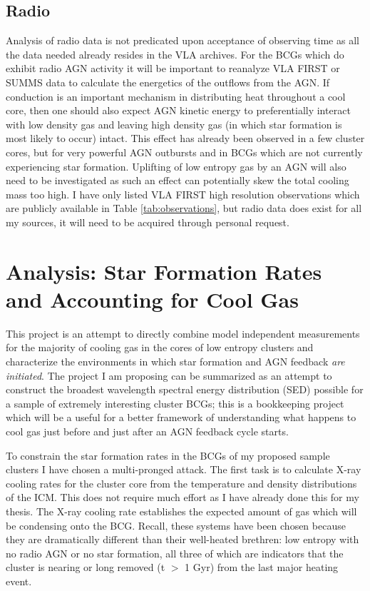 \documentclass[11pt]{article}
\begin{document}
\subsection{Radio}
Analysis of radio data is not predicated upon acceptance of observing
time as all the data needed already resides in the VLA archives. For
the BCGs which do exhibit radio AGN activity it will be important to
reanalyze VLA FIRST or SUMMS data to calculate the energetics of the
outflows from the AGN. If conduction is an important mechanism in
distributing heat throughout a cool core, then one should also expect
AGN kinetic energy to preferentially interact with low density gas
and leaving high density gas (in which star formation is most likely
to occur) intact. This effect has already been observed in a few
cluster cores, but for very powerful AGN outbursts and in BCGs which
are not currently experiencing star formation. Uplifting of low
entropy gas by an AGN will also need to be investigated as such an
effect can potentially skew the total cooling mass too high. I have
only listed VLA FIRST high resolution observations which are
publicly available in Table \ref{tab:observations}, but radio data
does exist for all my sources, it will need to be acquired through
personal request.

\section{Analysis: Star Formation Rates and Accounting for Cool Gas}
This project is an attempt to directly combine model independent
measurements for the majority of cooling gas in the cores of low
entropy clusters and characterize the environments in which star
formation and AGN feedback {\it are initiated}. The project I am
proposing can be summarized as an attempt to construct the broadest
wavelength spectral energy distribution (SED) possible for a sample of
extremely interesting cluster BCGs; this is a bookkeeping project
which will be a useful for a better  framework of understanding what
happens to cool gas just before and just after an AGN feedback cycle
starts.

To constrain the star formation rates in the BCGs of my proposed
sample clusters I have chosen a multi-pronged attack. The first task is
to calculate X-ray cooling rates for the cluster core from the
temperature and density distributions of the ICM. This does not
require much effort as I have already done this for my thesis. The
X-ray cooling rate establishes the expected amount of gas which will be
condensing onto the BCG. Recall, these systems have been chosen
because they are dramatically different than their well-heated
brethren: low entropy with no radio AGN or no star formation, all
three of which are indicators that the cluster is nearing or long
removed (t $>$ 1 Gyr) from the last major heating event.
\end{document}
